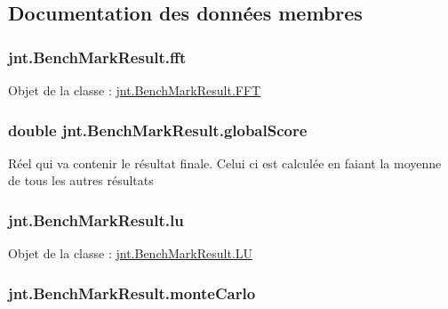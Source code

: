 \subsection{Documentation des données membres}
\hypertarget{classjnt_1_1BenchMarkResult_a4ccbb09fa780dd422598546e86c845d7}{
\subsubsection[{fft}]{ jnt.\-Bench\-Mark\-Result.\-fft}}\label{classjnt_1_1BenchMarkResult_a4ccbb09fa780dd422598546e86c845d7}
Objet de la classe \-: \hyperlink{classjnt_1_1BenchMarkResult_1_1FFT}{jnt.\-Bench\-Mark\-Result.\-F\-F\-T} \hypertarget{classjnt_1_1BenchMarkResult_aaea8ab4bb0f7f2fa52f719b0846c3a84}{
\subsubsection[{global\-Score}]{\setlength{\rightskip}{0pt plus 5cm}double jnt.\-Bench\-Mark\-Result.\-global\-Score}}\label{classjnt_1_1BenchMarkResult_aaea8ab4bb0f7f2fa52f719b0846c3a84}
Réel qui va contenir le résultat finale. Celui ci est calculée en faiant la moyenne de tous les autres résultats \hypertarget{classjnt_1_1BenchMarkResult_a615ece215df7fa40fa3de24fb62a8d7c}{
\subsubsection[{lu}]{ jnt.\-Bench\-Mark\-Result.\-lu}}\label{classjnt_1_1BenchMarkResult_a615ece215df7fa40fa3de24fb62a8d7c}
Objet de la classe \-: \hyperlink{classjnt_1_1BenchMarkResult_1_1LU}{jnt.\-Bench\-Mark\-Result.\-L\-U} \hypertarget{classjnt_1_1BenchMarkResult_a9f32de31bdbd4ecdf9ea3832825e0ba8}{
\subsubsection[{monte\-Carlo}]{ jnt.\-Bench\-Mark\-Result.\-monte\-Carlo}}\label{classjnt_1_1BenchMarkResult_a9f32de31bdbd4ecdf9ea3832825e0ba8}

